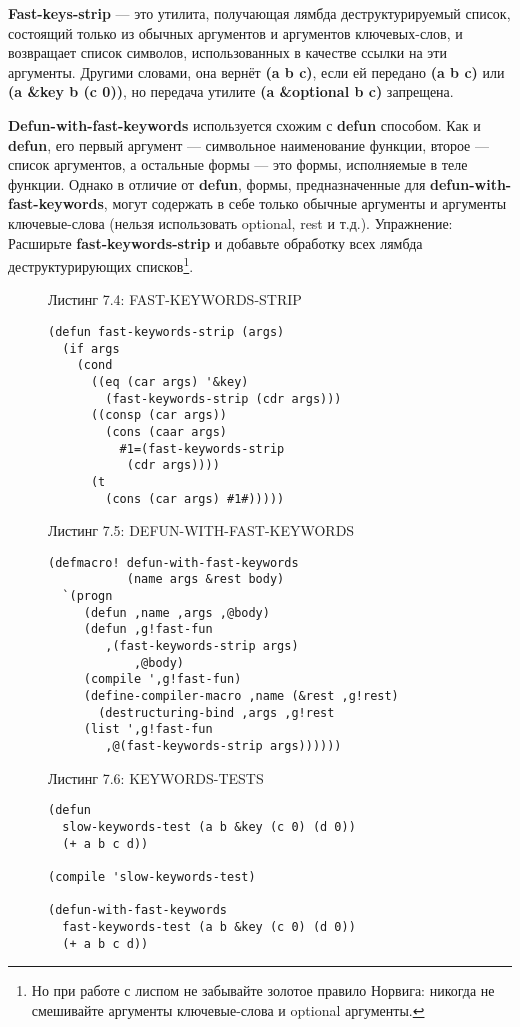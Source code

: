 \textbf{Fast-keys-strip} --- это утилита, получающая лямбда деструктурируемый список, состоящий только из обычных аргументов и аргументов ключевых-слов, и возвращает список символов, использованных в качестве ссылки на эти аргументы. Другими словами, она вернёт \textbf{(a b c)}, если ей передано \textbf{(a b c)} или \textbf{(a \&key b (c 0))}, но передача утилите \textbf{(a \&optional b c)} запрещена.

\textbf{Defun-with-fast-keywords} используется схожим с \textbf{defun} способом. Как и \textbf{defun}, его первый аргумент --- символьное наименование функции, второе --- список аргументов, а остальные формы --- это формы, исполняемые в теле функции. Однако в отличие от \textbf{defun}, формы, предназначенные для \textbf{defun-with-fast-keywords}, могут содержать в себе только обычные аргументы и аргументы ключевые-слова (нельзя использовать optional, rest и т.д.). Упражнение: Расширьте \textbf{fast-keywords-strip} и добавьте обработку всех лямбда деструктурирующих списков\footnote{Но при работе с лиспом не забывайте золотое правило Норвига: никогда не смешивайте аргументы ключевые-слова и optional аргументы.}.

\begin{figure}Листинг 7.4: FAST-KEYWORDS-STRIP\label{listing_7.4}
\listbegin
\begin{verbatim}
(defun fast-keywords-strip (args)
  (if args
    (cond
      ((eq (car args) '&key)
        (fast-keywords-strip (cdr args)))
      ((consp (car args))
        (cons (caar args)
	      #1=(fast-keywords-strip
		   (cdr args))))
      (t
        (cons (car args) #1#)))))
\end{verbatim}
\listend
\end{figure}

\begin{figure}Листинг 7.5: DEFUN-WITH-FAST-KEYWORDS\label{listing_7.5}
\listbegin
\begin{verbatim}
(defmacro! defun-with-fast-keywords
           (name args &rest body)
  `(progn
     (defun ,name ,args ,@body)
     (defun ,g!fast-fun
	    ,(fast-keywords-strip args)
            ,@body)
     (compile ',g!fast-fun)
     (define-compiler-macro ,name (&rest ,g!rest)
       (destructuring-bind ,args ,g!rest
	 (list ',g!fast-fun
		,@(fast-keywords-strip args))))))
\end{verbatim}
\listend
\end{figure}

\begin{figure}Листинг 7.6: KEYWORDS-TESTS\label{listing_7.6}
\listbegin
\begin{verbatim}
(defun
  slow-keywords-test (a b &key (c 0) (d 0))
  (+ a b c d))

(compile 'slow-keywords-test)

(defun-with-fast-keywords
  fast-keywords-test (a b &key (c 0) (d 0))
  (+ a b c d))
\end{verbatim}
\listend
\end{figure}


